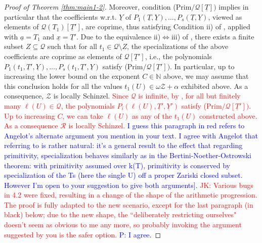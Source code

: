 \documentclass[11pt,a4paper,reqno]{amsart}
\theoremstyle{definition}
\begin{document}
\begin{proof}[Proof of Theorem \ref{thm:main1-2}]
Moreover, condition {\rm (Prim}$/{\mathcal Q}[\underline T])$ implies in particular that the coefficients w.r.t. $\underline{Y}$ of $P_1(\underline{T},\underline{Y}), \dots, P_s(\underline{T},\underline{Y})$, viewed as elements of $\mathcal{Q}(T_1)[\underline{T}']$, are coprime, thus satisfying Condition ii) of \cite[Proposition 3.1]{BD22}, applied with $\underline{a}=T_1$ and $\underline{x}=\underline{T}'$. Due to the equivalence ii)$\Leftrightarrow$iii) of  \cite[Proposition 3.1]{BD22}, there exists a finite subset $Z\subseteq \mathcal{Q}$ such that for all $t_1\in \mathcal{Q}\setminus Z$, the specializations of the above coefficients are coprime as elements of $\mathcal{Q}[\underline{T}']$, i.e., the polynomials $P_1(t_1,\underline{T}', \underline{Y}), \dots, P_s(t_1,\underline{T}', \underline{Y})$ satisfy {\rm (Prim}$/{\mathcal Q}[\underline T'])$. In particular, up to increasing the lower bound on the exponent $C\in \mathbb{N}$ above, we may assume that this conclusion holds for all the values $t_1(U)\in \omega\mathcal{Z}+\alpha$ exhibited above. As a consequence, $\mathcal{Z}$ is locally Schinzel.
\iffalse
\textcolor{red}{Since $\mathcal{Q}$ is infinite, by \cite[Proposition 3.1.]{BD22}, for all but finitely many $\ell(U) \in \mathcal{Q}$, the polynomials $P_i(\ell(U),\underline{T}',\underline{Y}')$ satisfy {\rm(Prim}$/{\mathcal Q}[\underline T'])$. Up to increasing $C$, we can take $\ell(U)$ as any of the $t_1(U)$ constructed above. As a consequence $\mathcal R$ is locally Schinzel.}
\textcolor{blue}{I guess this paragraph in red refers to Angelot's alternate argument you mention in your text. I agree with Angelot that referring to \cite[Proposition 3.1.]{BD22} is rather natural: it's a general result to the effect that regarding primitivity, specialization behaves similarly as in the Bertini-Noether-Ostrowski theorem: with primitivity assumed over k(T), primitivity is conserved by specialization of the Ts (here the single U) off a proper Zariski closed subset. However I'm open to your suggestion to give both arguments].} 
\textcolor{red}{JK: Various bugs in 4.2 were fixed, resulting in a change of the shape of the arithmetic progression. The proof is fully adapted to the new scenario, except for the last paragraph (in black) below; due to the new shape, the ``deliberately restricting ourselves" doesn't seem as obvious to me any more, so probably invoking the argument suggested by you is the safer option.} \textcolor{blue}{P: I agree.}


\end{proof}
\end{document}
